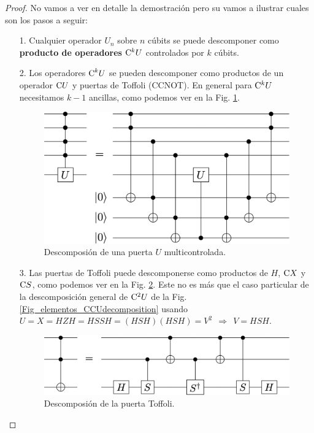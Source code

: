 \documentclass[a4paper,11pt]{book} %
\numberwithin{equation}{chapter}
\newcommand{\cg}[1]{{\rm C}#1}
\begin{document}
	\begin{proof}
	No vamos a ver en detalle la demostración pero su vamos a ilustrar cuales son los pasos a seguir:
	\begin{itemize}
		\item[1.] Cualquier operador $U_n$ sobre $n$ cúbits se puede descomponer como \textbf{producto de operadores} $\cg{^kU}$ 
		controlados por $k$ cúbits.
		
		\item[2.] Los operadores $\hbox{C}^kU$ se pueden descomponer como productos de un  operador $\cg{U}$ y puertas de Toffoli (CCNOT).
		En general para $\cg{^kU}$ necesitamos $k-1$ ancillas, como podemos ver en la Fig. \ref{Fig_universal_CkUdecomposition}.
			\begin{figure}[H]
			\centering 
			\includegraphics[width=0.65\linewidth]{Figuras/Fig_universal_CkUdecomposition.png}
			\caption{Descomposión de una puerta $U$ multicontrolada.}
			\label{Fig_universal_CkUdecomposition}
			\end{figure}


		\item[3.] Las puertas de Toffoli puede descomponerse como productos de $H$, $\cg{X}$ y $\cg{S}$, como podemos ver en la 
		Fig. \ref{Fig_universal_Toffolidecomposition}. Este no es más que el caso particular  de la descomposición general 
		de $\cg{^2U}$ de la Fig. \ref{Fig_elementos_CCUdecomposition} usando 
		$U = X = HZH=HSSH =  (HSH)(HSH)= V^2 ~~\Rightarrow ~~V = HSH$.
			\begin{figure}[H]
			\centering 
			\includegraphics[width=0.65\linewidth]{Figuras/Fig_universal_Toffolidecomposition.png}
			\caption{Descomposión de la puerta Toffoli.}
			\label{Fig_universal_Toffolidecomposition}
			\end{figure}


\end{itemize}
\end{proof}
\end{document}
